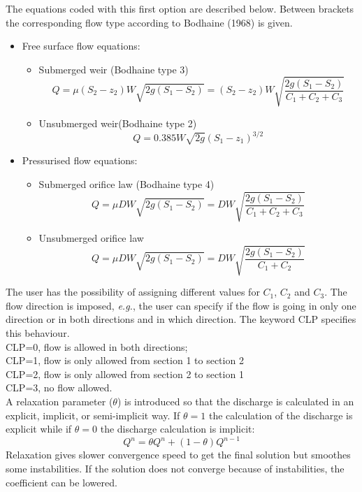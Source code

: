 The equations coded with this first option are described below.
Between brackets the corresponding flow type according to Bodhaine (1968) is given.
\begin{itemize}
\item Free surface flow equations:
  \begin{itemize}
  \item Submerged weir (Bodhaine type 3)
    \begin{equation}
      Q=\mu (S_2-z_2) W \sqrt{2g(S_1-S_2 )} = (S_2-z_2) W \sqrt{\dfrac{2g(S_1-S_2)}{C_1+C_2+C_3}}
    \end{equation}
  \item Unsubmerged weir(Bodhaine type 2)
    \begin{equation}
      Q=0.385 W \sqrt{2g}(S_1-z_1)^{3/2}
    \end{equation}
  \end{itemize}
\item Pressurised flow equations:
  \begin{itemize}
  \item Submerged orifice law (Bodhaine type 4)
    \begin{equation}
      Q=\mu D W \sqrt{2g(S_1-S_2 )} = D W \sqrt{\dfrac{2g(S_1-S_2)}{C_1+C_2+C_3}}
    \end{equation}
  \item Unsubmerged orifice law
    \begin{equation}
    Q= \mu D W \sqrt{2g(S_1-S_2)} = D W \sqrt{\dfrac{2g(S_1-S_2)}{C_1+C_2}}
    \end{equation}
  \end{itemize}
\end{itemize}

The user has the possibility of assigning different values for $C_1$, $C_2$ and $C_3$.
The flow direction is imposed, \textit{e.g.}, the user can specify if the flow is going
in only one direction or in both directions and in which direction.
The keyword CLP specifies this behaviour.\\
CLP=0, flow is allowed in both directions;\\
CLP=1, flow is only allowed from section 1 to section 2\\
CLP=2, flow is only allowed from section 2 to section 1\\
CLP=3, no flow allowed.\\
A relaxation parameter ($\theta$) is introduced so that the discharge is calculated
in an explicit, implicit, or semi-implicit way.
If $\theta=1$ the calculation of the discharge is explicit while if $\theta=0$
the discharge calculation is implicit:
\begin{equation}
  Q^n=\theta Q^n + (1-\theta) Q^{n-1}
\end{equation}
Relaxation gives slower convergence speed to get the final solution
but smoothes some instabilities.
If the solution does not converge because of instabilities, the coefficient can be lowered.

